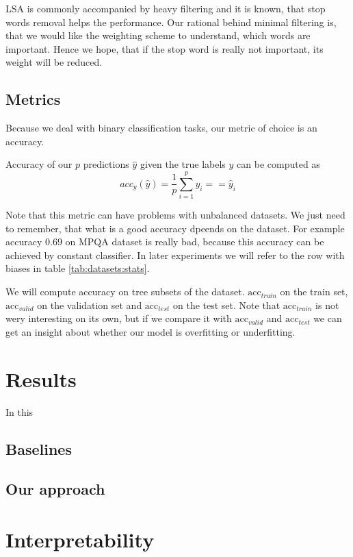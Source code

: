     LSA is commonly accompanied by heavy filtering and it is known, that stop words removal helps the performance.
    Our rational behind minimal filtering is, that we would like the weighting scheme to understand, which words are important.
    Hence we hope, that if the stop word is really not important, its weight will be reduced.
    
    \subsection{Metrics}
    
    Because we deal with binary classification tasks, our metric of choice is an accuracy.
    
    Accuracy of our $p$ predictions $\hat{y}$ given the true labels $y$ can be computed as
    $$acc_y(\hat{y}) = \frac{1}{p}\sum_{i=1}^py_i ==\hat{y}_i$$
    
    Note that this metric can have problems with unbalanced datasets. 
    We just need to remember, that what is a good accuracy dpeends on the dataset.
    For example accuracy $0.69$ on MPQA dataset is really bad, because this accuracy can be achieved by constant classifier.
    In later experiments we will refer to the row with biases in table \ref{tab:datasets:stats}.
    
    We will compute accuracy on tree subsets of the dataset. 
    $\mathrm{acc}_{train}$ on the train set, $\mathrm{acc}_{valid}$ on the validation set and $\mathrm{acc}_{test}$ on the test set.
    Note that $\mathrm{acc}_{train}$ is not wery interesting on its own, but if we compare it with $\mathrm{acc}_{valid}$ and $\mathrm{acc}_{test}$ we can get an insight about whether our model is overfitting or underfitting.



\section{Results}
    In this
    
    \subsection{Baselines}
    
    
    
    \subsection{Our approach}
    

\section{Interpretability}
    \cite{ribeiro2016should} %


